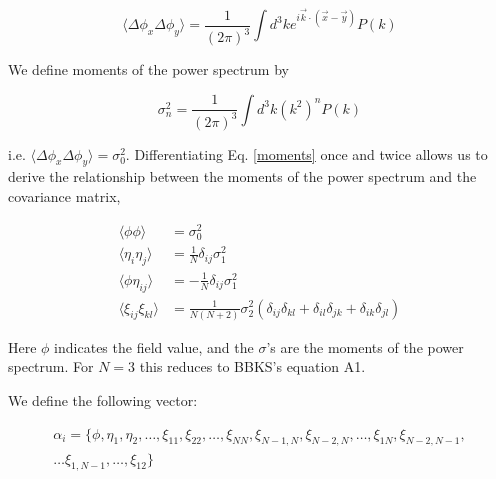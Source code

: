 \documentclass[12pt]{article}
\begin{document}
\begin{equation}
\langle \Delta \phi_x \Delta \phi_y \rangle = \frac{1}{(2\pi)^3} \int d^3k e^{i \vec{k} \cdot (\vec{x}-\vec{y})} P(k)
\end{equation}

We define moments of the power spectrum by

\begin{equation} \label{moments}
\sigma_n^2 = \frac{1}{(2\pi)^3}\int d^3k (k^{2})^n P(k)
\end{equation}

\noindent i.e. $\langle \Delta \phi_x \Delta \phi_y \rangle = \sigma_0^2$. Differentiating Eq. \ref{moments} once and twice allows us to derive the relationship between the moments of the power spectrum and the covariance matrix,


\begin{equation} \label{corr}
\begin{split}
\langle\phi\phi\rangle &= \sigma_0^2 \\
\langle\eta_i\eta_j\rangle &= \frac{1}{N}\delta_{ij}\sigma_1^2 \\
\langle\phi\eta_{ij}\rangle &= -\frac{1}{N}\delta_{ij}\sigma_1^2 \\
\langle\xi_{ij}\xi_{kl}\rangle &= \frac{1}{N(N+2)}\sigma_2^2(\delta_{ij}\delta_{kl}+\delta_{il}\delta_{jk}+\delta_{ik}\delta_{jl})
\end{split}
\end{equation}

\noindent Here $\phi$ indicates the field value, and the $\sigma$'s are the moments of the power spectrum. For $N=3$ this reduces to BBKS's equation A1. 

We define the following vector:

\begin{equation}
\begin{split}
\alpha_i = \{\phi,\eta_1,\eta_2,\ldots,\xi_{11},\xi_{22},\ldots,\xi_{NN},\xi_{N-1,N},\xi_{N-2,N},\ldots,\xi_{1N},\xi_{N-2,N-1},\\
\ldots\xi_{1,N-1},\ldots,\xi_{12}\}
\end{split}
\end{equation}
\end{document}
